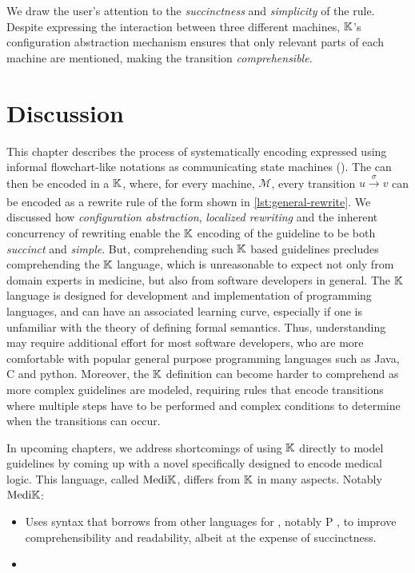 We draw the user's attention to the \textit{succinctness} and \textit{simplicity}
of the rule. Despite expressing the interaction between three different machines,
$\mathbb{K}$'s configuration abstraction mechanism ensures that only relevant parts of
each machine are mentioned, making the transition \textit{comprehensible}.

\section{Discussion}

This chapter describes the process of systematically encoding
\BPGs{} expressed using informal flowchart-like notations as communicating
state machines (\CSMs{}). The \CSMs{} can then be encoded in a $\mathbb{K}{}$,
where, for every machine, $\mathcal{M}$, every transition
$u \xrightarrow[]{\sigma} v$
can be encoded as a rewrite rule of the form shown in
\autoref{lst:general-rewrite}. We discussed how
\emph{configuration abstraction}, \emph{localized rewriting} and
the inherent concurrency of rewriting enable the $\mathbb{K}$ encoding of
the guideline to be both \textit{succinct} and \textit{simple}.
But, comprehending such $\mathbb{K}$ based guidelines precludes comprehending
the $\mathbb{K}$ language, which is unreasonable to expect not only from domain
experts in medicine, but also from software developers in general.
The $\mathbb{K}$ language is designed for development and implementation of
programming languages, and can have an associated learning curve, especially
if one is unfamiliar with the theory of defining formal semantics.
Thus, understanding \K{} may require additional effort
for most software developers, who are more comfortable with
popular general purpose programming languages such as Java, C and python.
Moreover, the $\mathbb{K}$ definition can become harder to comprehend as
more complex guidelines are modeled, requiring rules that encode
transitions where multiple steps have to be performed and complex
conditions to determine when the transitions can occur.

In upcoming chapters, we address shortcomings of using $\mathbb{K}$ directly
to model guidelines by coming up with a novel \DSL{} specifically
designed to encode medical logic. This language, called $\text{Medi}\mathbb{K}{}{}$,
differs from $\mathbb{K}$ in many aspects. Notably $\text{Medi}\mathbb{K}{}$:
\begin{itemize}
  \item Uses syntax that borrows from other languages for \CSMs{}, notably P
    \cite{DesaiPLDI13}, to improve comprehensibility and readability, albeit at
    the expense of succinctness.
  \item
\end{itemize}
